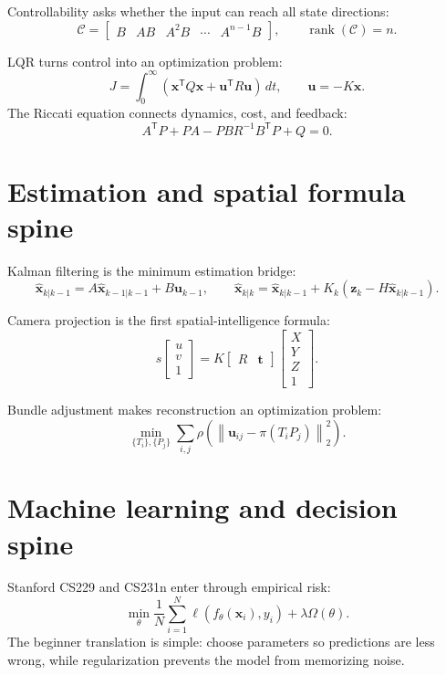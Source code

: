 \documentclass[11pt]{article}
\begin{document}
Controllability asks whether the input can reach all state directions:
\[
  \mathcal{C}=\begin{bmatrix}B & AB & A^2B & \cdots & A^{n-1}B\end{bmatrix},
  \qquad \operatorname{rank}(\mathcal{C})=n.
\]

LQR turns control into an optimization problem:
\[
  J=\int_0^\infty \left(\bm{x}^{\mathsf T}Q\bm{x}+\bm{u}^{\mathsf T}R\bm{u}\right)\,dt,
  \qquad \bm{u}=-K\bm{x}.
\]
The Riccati equation connects dynamics, cost, and feedback:
\[
  A^{\mathsf T}P+PA-PBR^{-1}B^{\mathsf T}P+Q=0.
\]

\section*{Estimation and spatial formula spine}
Kalman filtering is the minimum estimation bridge:
\[
  \hat{\bm{x}}_{k|k-1}=A\hat{\bm{x}}_{k-1|k-1}+B\bm{u}_{k-1},
  \qquad
  \hat{\bm{x}}_{k|k}=\hat{\bm{x}}_{k|k-1}+K_k(\bm{z}_k-H\hat{\bm{x}}_{k|k-1}).
\]

Camera projection is the first spatial-intelligence formula:
\[
  s
  \begin{bmatrix}
    u\\v\\1
  \end{bmatrix}
  =
  K
  \begin{bmatrix}
    R & \bm{t}
  \end{bmatrix}
  \begin{bmatrix}
    X\\Y\\Z\\1
  \end{bmatrix}.
\]

Bundle adjustment makes reconstruction an optimization problem:
\[
  \min_{\{T_i\},\{P_j\}}
  \sum_{i,j}
  \rho\left(
    \left\|
      \bm{u}_{ij}-\pi(T_iP_j)
    \right\|_2^2
  \right).
\]

\section*{Machine learning and decision spine}
Stanford CS229 and CS231n enter through empirical risk:
\[
  \min_{\theta} \frac{1}{N}\sum_{i=1}^N \ell\left(f_{\theta}(\bm{x}_i), y_i\right)
  + \lambda\Omega(\theta).
\]
The beginner translation is simple: choose parameters so predictions are less wrong, while regularization prevents the model from memorizing noise.
\end{document}
